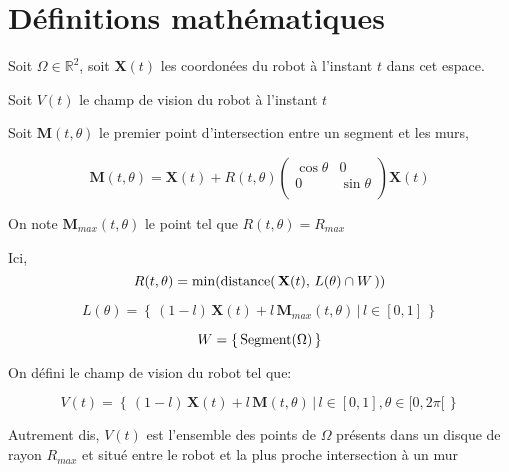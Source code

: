 \documentclass[main.tex]{subfiles}
\begin{document}
\section{Définitions mathématiques}

Soit $\Omega \in \mathbb{R}^{2}$, soit $\mathbf{X}(t)$ les coordonées du robot à l'instant $t$ dans cet espace.


Soit $ V(t)$ le champ de vision du robot à l'instant $t$

Soit $\mathbf{M}(t, \theta)$ le premier point d'intersection entre un segment et les murs, 

\begin{equation*}
    \displaystyle
    \mathbf{M}(t, \theta) = \mathbf{X}(t) + R(t, \theta) 
    \begin{pmatrix}
        \cos \theta & 0\\
        0 & \sin \theta\\
    \end{pmatrix} 
    \mathbf{X}(t)
\end{equation*}

On note $\mathbf{M}_{max} (t, \theta)$ le point tel que $R(t, \theta) = R_{max}$

Ici,
\begin{equation*}
    \displaystyle
    R(t, \theta) = \min (\text{\rmfamily distance}( \, \mathbf{X}(t), \, L(\theta) \cap W \,))
\end{equation*}

\begin{equation*}
    \displaystyle
    L(\theta) = \left\{ \, (1 - l) \, \mathbf{X}(t) + l\, \mathbf{M}_{max}(t, \theta) \,|\, l \in [0, 1]\, \right\}
\end{equation*}

\begin{equation*}
    \displaystyle
    W = \left\{ \, \text{\rmfamily Segment} (\Omega)\, \right\}
\end{equation*}

On défini le champ de vision du robot tel que:


\begin{equation}
    \displaystyle
    V(t) = \left\{ \, (1 - l) \, \mathbf{X}(t) + l\, \mathbf{M}(t, \theta) \,|\, l \in [0, 1], \theta \in [0, 2 \pi[ \, \right\}
\end{equation}

Autrement dis, $V(t)$ est l'ensemble des points de $\Omega$ présents dans un disque de rayon $R_{max}$ et situé entre le robot et la plus proche intersection à un mur 
\end{document}
